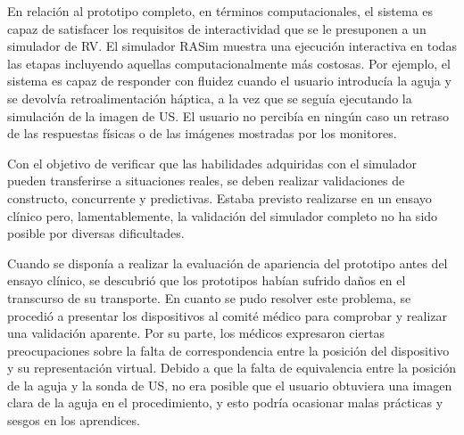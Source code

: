 



En relación al prototipo completo, en términos computacionales, el sistema es capaz de satisfacer los requisitos de interactividad que se le presuponen a un simulador de \ac{RV}. El simulador \ac{RASim} muestra una ejecución interactiva en todas las etapas incluyendo aquellas computacionalmente más costosas. Por ejemplo, el sistema es capaz de responder con fluidez cuando el usuario introducía la aguja y se devolvía retroalimentación háptica, a la vez que se seguía ejecutando la simulación de la imagen de \ac{US}. El usuario no percibía en ningún caso un retraso de las respuestas físicas o de las imágenes mostradas por los monitores.

Con el objetivo de verificar que las habilidades adquiridas con el simulador pueden transferirse a situaciones reales, se deben realizar validaciones de constructo, concurrente y predictivas. Estaba previsto realizarse en un ensayo clínico pero, lamentablemente, la validación del simulador completo no ha sido posible por diversas dificultades.

Cuando se disponía a realizar la evaluación de apariencia del prototipo antes del ensayo clínico, se descubrió que los prototipos habían sufrido daños en el transcurso de su transporte. %
En cuanto se pudo resolver este problema, se procedió a presentar los dispositivos al comité médico para comprobar y realizar una validación aparente. Por su parte, los médicos expresaron ciertas preocupaciones sobre la falta de correspondencia entre la posición del dispositivo y su representación virtual. Debido a que la falta de equivalencia entre la posición de la aguja y la sonda de \ac{US}, no era posible que el usuario obtuviera una imagen clara de la aguja en el procedimiento, y esto podría ocasionar malas prácticas y sesgos en los aprendices. 


